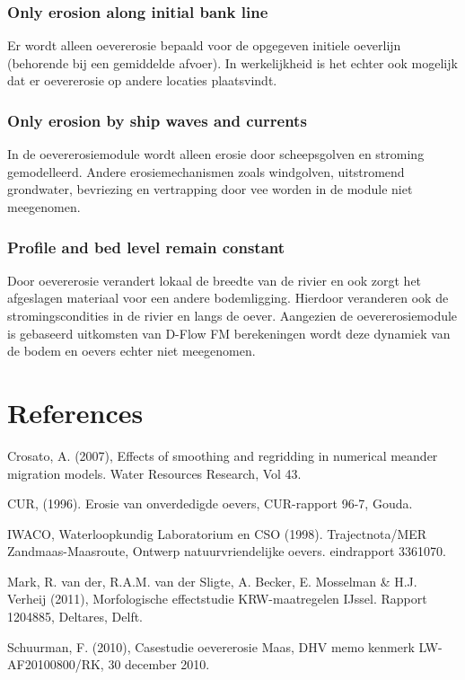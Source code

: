 \subsection{Only erosion along initial bank line}

Er wordt alleen oevererosie bepaald voor de opgegeven initiele oeverlijn (behorende bij een gemiddelde afvoer).
In werkelijkheid is het echter ook mogelijk dat er oevererosie op andere locaties plaatsvindt.

\subsection{Only erosion by ship waves and currents}

In de oevererosiemodule wordt alleen erosie door scheepsgolven en stroming gemodelleerd.
Andere erosiemechanismen zoals windgolven, uitstromend grondwater, bevriezing en vertrapping door vee worden in de module niet meegenomen.

\subsection{Profile and bed level remain constant}

Door oevererosie verandert lokaal de breedte van de rivier en ook zorgt het afgeslagen materiaal voor een andere bodemligging.
Hierdoor veranderen ook de stromingscondities in de rivier en langs de oever.
Aangezien de oevererosiemodule is gebaseerd uitkomsten van D-Flow FM berekeningen wordt deze dynamiek van de bodem en oevers echter niet meegenomen.

\chapter*{References}

Crosato, A. (2007), Effects of smoothing and regridding in numerical meander migration models. Water Resources Research, Vol 43.

CUR, (1996). Erosie van onverdedigde oevers, CUR-rapport 96-7, Gouda.

IWACO, Waterloopkundig Laboratorium en CSO (1998). Trajectnota/MER Zandmaas-Maasroute, Ontwerp natuurvriendelijke oevers. eindrapport 3361070.

Mark, R. van der, R.A.M. van der Sligte, A. Becker, E. Mosselman \& H.J. Verheij (2011), Morfologische effectstudie KRW-maatregelen IJssel.
Rapport 1204885, Deltares, Delft.

Schuurman, F. (2010), Casestudie oevererosie Maas, DHV memo kenmerk LW-AF20100800/RK, 30 december 2010.

